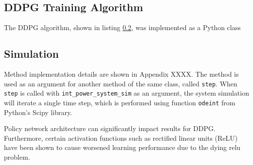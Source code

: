
\subsection{DDPG Training Algorithm}

The DDPG algorithm, shown in listing \ref{}, was implemented as a Python class \verb||


\subsection{Simulation}
Method implementation details are shown in Appendix XXXX. The method is used as an argument for another method of the same class, called \verb|step|. When \verb|step| is called with \verb|int_power_system_sim| as an argument, the system simulation will iterate a single time step, which is performed using function \verb|odeint| from Python's Scipy library.




Policy network architecture can significantly impact results for DDPG. Furthermore, certain activation functions such as rectified linear units (ReLU) have been shown to cause worsened learning performance due to the dying relu problem.